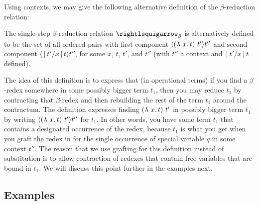 \noindent Using contexts, we may give the following alternative definition of the $\beta$-reduction relation:

\begin{definition}
\label{def:betactxt}
The single-step $\beta$-reduction relation
$\curva_\beta$ is alternatively defined to be the set of all ordered pairs with first component $\langle (\lambda\ x.\, t)\ t' \rangle t''$
  and second component $\langle [t'/x]t \rangle t''$, for some $x$, $t$, $t'$, and $t''$ (with $t''$ a context and $[t'/x]t$ defined).
\end{definition}

The idea of this definition is to express that (in operational terms)
if you find a $\beta$-redex somewhere in some possibly bigger term
$t_1$, then you may reduce $t_1$ by contracting that $\beta$-redex and
then rebuilding the rest of the term $t_1$ around the contractum.  The
definition expresses finding $(\lambda\ x.\, t)\ t'$ in possibly bigger
term $t_1$ by writing $\langle(\lambda\ x.\, t)\ t'\rangle t''$ for $t_1$.
In other words, you have some term $t_1$ that contains a designated
occurrence of the redex, because $t_1$ is what you get when you graft
the redex in for the single occurrence of special variable $q$ in some
context $t''$.  The reason that we use grafting for this definition
instead of substitution is to allow contraction of redexes that
contain free variables that are bound in $t_1$.  We will discuss this
point further in the examples next.

\subsection{Examples}
\label{sec:betaex}

